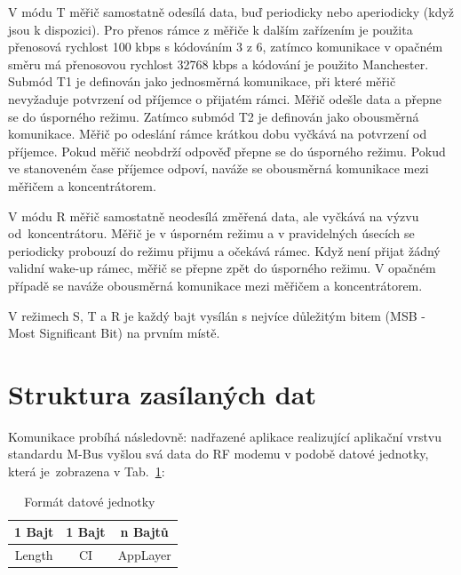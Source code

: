 V	módu T měřič samostatně odesílá data, buď periodicky nebo aperiodicky (když jsou k dispozici). Pro přenos rámce z měřiče k dalším zařízením je použita přenosová rychlost 100 kbps s kódováním 3 z 6, zatímco komunikace v opačném směru má přenosovou rychlost 32768 kbps a kódování je použito Manchester. Submód T1 je definován jako jednosměrná komunikace, při které měřič nevyžaduje potvrzení od příjemce o přijatém rámci. Měřič odešle data a přepne se do úsporného režimu. Zatímco submód T2 je definován jako obousměrná komunikace. Měřič po odeslání rámce krátkou dobu vyčkává na potvrzení od příjemce. Pokud měřič neobdrží odpověď přepne se do úsporného režimu. Pokud ve stanoveném čase příjemce odpoví, naváže se obousměrná komunikace mezi měřičem a koncentrátorem.

V	módu R měřič samostatně neodesílá změřená data, ale vyčkává na výzvu od~koncentrátoru. Měřič je v úsporném režimu a v pravidelných úsecích se periodicky probouzí do režimu přijmu a očekává rámec. Když není přijat žádný validní wake-up rámec, měřič se přepne zpět do úsporného režimu. V	opačném případě se naváže obousměrná komunikace mezi měřičem a koncentrátorem.

V režimech S, T a R je každý bajt vysílán s nejvíce důležitým bitem (MSB - Most
Significant Bit) na prvním místě.



\section{Struktura zasílaných dat}
Komunikace probíhá následovně: nadřazené aplikace realizující aplikační vrstvu standardu M-Bus vyšlou svá data do RF modemu v podobě datové jednotky, která je~zobrazena v Tab.~\ref{PaketWm1}:

\begin{table}[!ht]
\vspace{-10pt}
\centering
\begin{tabular}{ccc}
1 Bajt & 1 Bajt & n Bajtů \\ \hline
\multicolumn{1}{|c|}{Length} & \multicolumn{1}{c|}{CI} & \multicolumn{1}{c|}{AppLayer} \\ \hline
\end{tabular}
\caption{Formát datové jednotky~\cite{FormatDatoveJednotky}}
\label{PaketWm1}
\vspace{-10pt}
\end{table}

